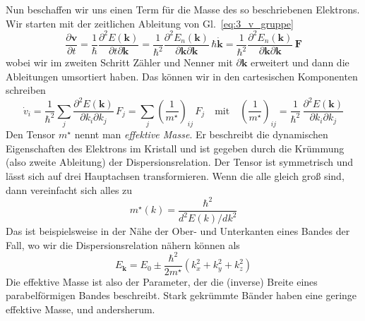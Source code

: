 Nun beschaffen wir uns einen Term für die Masse des so beschriebenen Elektrons. Wir starten mit der zeitlichen Ableitung von Gl.~\ref{eq:3_v_gruppe}
\begin{equation}
  \frac{\partial \mathbf{v}}{\partial t} = \frac{1}{\hbar}   \frac{\partial^2 E(\mathbf{k})}{\partial t \partial \mathbf{k}} 
  = \frac{1}{\hbar^2}   \frac{\partial^2 E_n(\mathbf{k})}{\partial \mathbf{k} \partial \mathbf{k}} \, \hbar \dot{\mathbf{k}}
  = \frac{1}{\hbar^2}   \frac{\partial^2 E_n(\mathbf{k})}{\partial \mathbf{k} \partial \mathbf{k}} \, \mathbf{F}
\end{equation}
wobei wir im zweiten Schritt Zähler und Nenner mit $\partial \mathbf{k}$ erweitert und dann die Ableitungen umsortiert haben. Das können wir in den cartesischen Komponenten schreiben
\begin{equation}
   \dot{v}_i =  \frac{1}{\hbar^2} \sum_j  \frac{\partial^2 E(\mathbf{k})}{\partial k_i \partial k_j} \, F_j
= \sum_j \left( \frac{1}{m^\star} \right)_{ij} \, F_j
\quad \text{mit} \quad 
\left( \frac{1}{m^\star} \right)_{ij}  =  \frac{1}{\hbar^2} \, \frac{\partial^2 E(\mathbf{k})}{\partial k_i \partial k_j}
\end{equation}
Den Tensor $m^\star$ nennt man \emph{effektive Masse}. Er beschreibt die dynamischen Eigenschaften des Elektrons im Kristall und ist gegeben durch die Krümmung (also zweite Ableitung) der Dispersionsrelation. Der Tensor ist symmetrisch und lässt sich auf drei Hauptachsen transformieren. Wenn die alle gleich groß sind, dann vereinfacht sich alles zu
\begin{equation}
   m^\star(k) = \frac{\hbar^2}{d^2 E(k)/dk^2}
\end{equation}
Das ist beispielsweise in der Nähe der Ober- und Unterkanten eines Bandes der Fall, wo wir die Dispersionsrelation nähern können als
\begin{equation}
   E_\mathbf{k} = E_0 \pm \frac{\hbar^2}{2 m^\star} \left(k_x^2 + k_y^2 + k_z^2 \right) \label{eq:3_parabel_band}
\end{equation}
Die effektive Masse ist also der Parameter, der die (inverse) Breite eines parabelförmigen Bandes beschreibt. Stark gekrümmte Bänder haben eine geringe effektive Masse, und andersherum.

